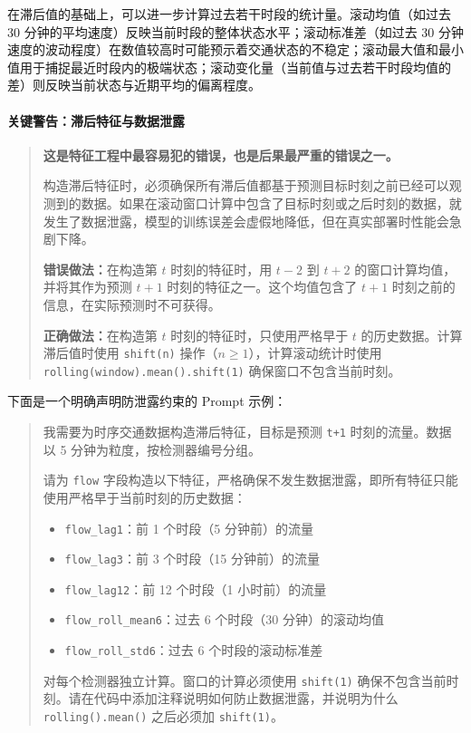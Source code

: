 在滞后值的基础上，可以进一步计算过去若干时段的统计量。滚动均值（如过去 30 分钟的平均速度）反映当前时段的整体状态水平；滚动标准差（如过去 30 分钟速度的波动程度）在数值较高时可能预示着交通状态的不稳定；滚动最大值和最小值用于捕捉最近时段内的极端状态；滚动变化量（当前值与过去若干时段均值的差）则反映当前状态与近期平均的偏离程度。

\paragraph{关键警告：滞后特征与数据泄露}

\begin{quote}
\textbf{这是特征工程中最容易犯的错误，也是后果最严重的错误之一。}

构造滞后特征时，必须确保所有滞后值都基于预测目标时刻之前已经可以观测到的数据。如果在滚动窗口计算中包含了目标时刻或之后时刻的数据，就发生了数据泄露，模型的训练误差会虚假地降低，但在真实部署时性能会急剧下降。

\textbf{错误做法：}在构造第 $t$ 时刻的特征时，用 $t-2$ 到 $t+2$ 的窗口计算均值，并将其作为预测 $t+1$ 时刻的特征之一。这个均值包含了 $t+1$ 时刻之前的信息，在实际预测时不可获得。

\textbf{正确做法：}在构造第 $t$ 时刻的特征时，只使用严格早于 $t$ 的历史数据。计算滞后值时使用 \texttt{shift(n)} 操作（$n \geq 1$），计算滚动统计时使用 \texttt{rolling(window).mean().shift(1)} 确保窗口不包含当前时刻。
\end{quote}

下面是一个明确声明防泄露约束的 Prompt 示例：

\begin{quote}
我需要为时序交通数据构造滞后特征，目标是预测 \texttt{t+1} 时刻的流量。数据以 5 分钟为粒度，按检测器编号分组。

请为 \texttt{flow} 字段构造以下特征，严格确保不发生数据泄露，即所有特征只能使用严格早于当前时刻的历史数据：
\begin{itemize}
  \item \texttt{flow\_lag1}：前 1 个时段（5 分钟前）的流量
  \item \texttt{flow\_lag3}：前 3 个时段（15 分钟前）的流量
  \item \texttt{flow\_lag12}：前 12 个时段（1 小时前）的流量
  \item \texttt{flow\_roll\_mean6}：过去 6 个时段（30 分钟）的滚动均值
  \item \texttt{flow\_roll\_std6}：过去 6 个时段的滚动标准差
\end{itemize}

对每个检测器独立计算。窗口的计算必须使用 \texttt{shift(1)} 确保不包含当前时刻。请在代码中添加注释说明如何防止数据泄露，并说明为什么 \texttt{rolling().mean()} 之后必须加 \texttt{shift(1)}。
\end{quote}

